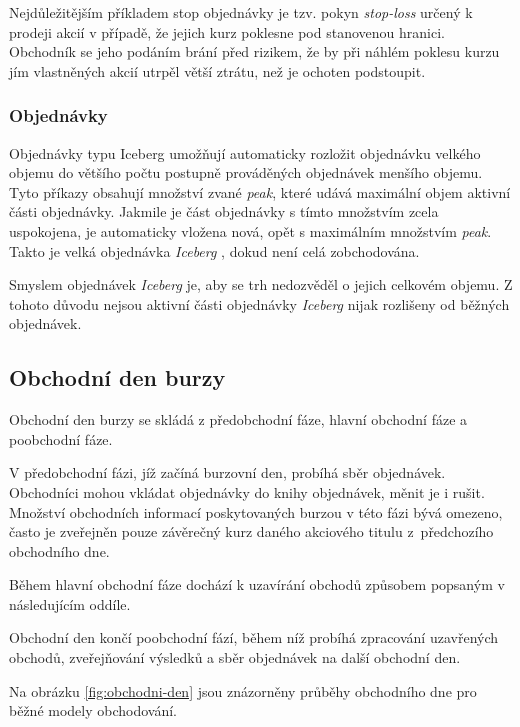 \documentclass[thesis=M,czech]{FITthesis}[2012/06/26]
\begin{document}
Nejdůležitějším příkladem stop objednávky je tzv. pokyn \textit{stop-loss} určený k prodeji akcií v případě, že jejich 
kurz poklesne pod stanovenou hranici. Obchodník se jeho podáním brání před rizikem, že by při náhlém poklesu kurzu 
jím vlastněných akcií utrpěl větší ztrátu, než je ochoten podstoupit.

\subsubsection{Objednávky }

Objednávky typu Iceberg umožňují automaticky rozložit objednávku velkého objemu do většího počtu postupně 
prováděných objednávek menšího objemu. Tyto příkazy obsahují množství zvané \textit{peak}, které udává maximální 
objem aktivní části objednávky. Jakmile je část objednávky s tímto množstvím zcela uspokojena, je automaticky vložena 
nová, opět s maximálním množstvím \textit{peak}. Takto je velká objednávka \textit{Iceberg} , dokud 
není celá zobchodována. 

Smyslem objednávek \textit{Iceberg} je, aby se trh nedozvěděl o jejich celkovém objemu. Z tohoto důvodu nejsou 
aktivní části objednávky \textit{Iceberg} nijak rozlišeny od běžných objednávek. %


\subsection{Obchodní den burzy}

Obchodní den burzy se skládá z předobchodní fáze, hlavní obchodní fáze a poobchodní fáze.

V předobchodní fázi, jíž začíná burzovní den, probíhá sběr objednávek. Obchodníci mohou vkládat objednávky do 
knihy objednávek, měnit je i rušit. Množství obchodních informací poskytovaných burzou v této fázi bývá omezeno, 
často je zveřejněn pouze závěrečný kurz daného akciového titulu z~předchozího obchodního dne. 

Během hlavní obchodní fáze dochází k uzavírání obchodů způsobem popsaným v následujícím oddíle.

Obchodní den končí poobchodní fází, během níž probíhá zpracování uzavřených obchodů, zveřejňování výsledků a 
sběr objednávek na další obchodní den. %

Na obrázku \ref{fig:obchodni-den} jsou znázorněny průběhy obchodního dne pro běžné modely obchodování.
\end{document}
